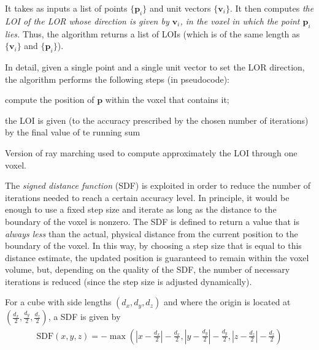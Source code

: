 \documentclass[a4paper, 11pt]{article}
\begin{document}
  It takes as inputs a list of points $\{\mathbf{p}_i\}$ and unit vectors $\{\mathbf{v}_i\}$. It then computes \textsl{the LOI of the LOR whose direction is given by $\mathbf{v}_i$, in the voxel in which the point $\mathbf{p}_i$ lies.} Thus, the algorithm returns a list of LOIs (which is of the same length as $\{\mathbf{v}_i\}$ and $\{\mathbf{p}_i\}$).

  In detail, given a single point and a single unit vector to set the LOR direction, the algorithm performs the following steps (in pseudocode):
  \vspace{0.5cm}\\
  \begin{algorithm}[H]
    compute the position of $\mathbf{p}$ within the voxel that contains it;
    

    the LOI is given (to the accuracy prescribed by the chosen number of iterations) by the final value of te running sum\;
    \caption{Version of ray marching used to compute approximately the LOI through one voxel.}
  \end{algorithm}
  \vspace{0.5cm}

  The \textsl{signed distance function} (SDF) is exploited in order to reduce the number of iterations needed to reach a certain accuracy level. In principle, it would be enough to use a fixed step size and iterate as long as the distance to the boundary of the voxel is nonzero. The SDF is defined to return a value that is \textsl{always less} than the actual, physical distance from the current position to the boundary of the voxel. In this way, by choosing a step size that is equal to this distance estimate, the updated position is guaranteed to remain within the voxel volume, but, depending on the quality of the SDF, the number of necessary iterations is reduced (since the step size is adjusted dynamically).

  For a cube with side lengths $(d_x, d_y, d_z)$ and where the origin is located at $(\frac{d_x}{2}, \frac{d_y}{2}, \frac{d_z}{2})$, a SDF is given by
  \begin{align}
    \text{SDF}(x, y, z) = -\max\left(\left| x - \frac{d_x}{2} \right| - \frac{d_x}{2}, \left| y - \frac{d_y}{2} \right| - \frac{d_y}{2}, \left| z - \frac{d_z}{2} \right| - \frac{d_z}{2}\right)
  \end{align}  
\end{document}
